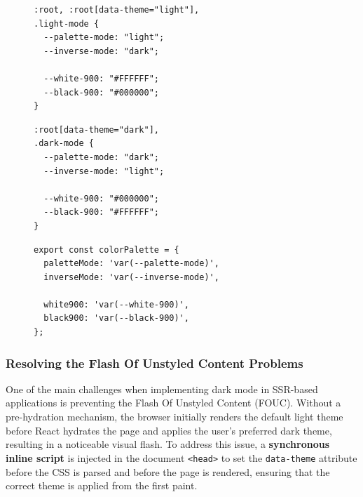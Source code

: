 \begin{figure}[H]
    \centering
    \begin{minipage}[t]{0.48\textwidth}
        \begin{lstlisting}[caption={custom-light-variables.css}]
:root, :root[data-theme="light"],
.light-mode {
  --palette-mode: "light";
  --inverse-mode: "dark";

  --white-900: "#FFFFFF";
  --black-900: "#000000";
}
        \end{lstlisting}
    \end{minipage}
    \hfill
    \begin{minipage}[t]{0.48\textwidth}
        \begin{lstlisting}[caption={custom-dark-variables.css}]
:root[data-theme="dark"],
.dark-mode {
  --palette-mode: "dark";
  --inverse-mode: "light";
  
  --white-900: "#000000";
  --black-900: "#FFFFFF";
}
        \end{lstlisting}
    \end{minipage}
\label{fig:css-variables-palettes}
\end{figure}
\begin{figure}[h]
    \centering
    \begin{minipage}[t]{0.24\textwidth}
    \end{minipage}
    \hfill
    \begin{minipage}[t]{0.48\textwidth}
        \begin{lstlisting}[caption={colorPalette.ts}]
export const colorPalette = {
  paletteMode: 'var(--palette-mode)',
  inverseMode: 'var(--inverse-mode)',

  white900: 'var(--white-900)',
  black900: 'var(--black-900)',
};
        \end{lstlisting}
    \end{minipage}
    \hfill
    \begin{minipage}[t]{0.24\textwidth}
    \end{minipage}
\label{fig:color-palette}
\end{figure}

\subsubsection{Resolving the Flash Of Unstyled Content Problems}

One of the main challenges when implementing dark mode in \acs{SSR}-based applications is preventing the Flash Of Unstyled Content (FOUC). Without a pre-hydration mechanism, the browser initially renders the default light theme before React hydrates the page and applies the user's preferred dark theme, resulting in a noticeable visual flash. To address this issue, a \textbf{synchronous inline script} is injected in the document \texttt{<head>} to set the \texttt{data-theme} attribute before the CSS is parsed and before the page is rendered, ensuring that the correct theme is applied from the first paint.

